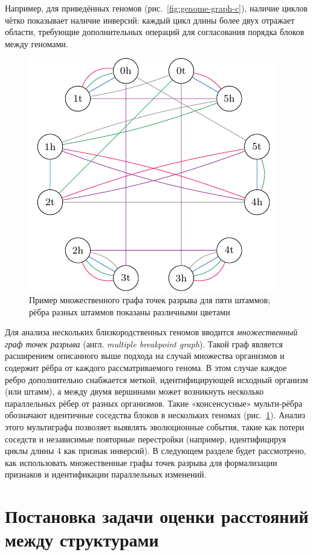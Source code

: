 Например, для приведённых геномов (рис.~\ref{fig:genome-graph-c}), наличие циклов чётко показывает наличие инверсий: каждый цикл длины более двух отражает области, требующие дополнительных операций для согласования порядка блоков между геномами.

\begin{figure}[h!]
    \centering
    \includegraphics[width=0.5\linewidth]{images/part1/genome-graph-pq7.pdf}
    \caption{Пример множественного графа точек разрыва для пяти штаммов; рёбра разных штаммов показаны различными цветами}
    \label{fig:multigraph-example}
\end{figure}

Для анализа нескольких близкородственных геномов вводится \textit{множественный граф точек разрыва} (англ. \textit{multiple breakpoint graph}).
Такой граф является расширением описанного выше подхода на случай множества организмов и содержит рёбра от каждого рассматриваемого генома.
В этом случае каждое ребро дополнительно снабжается меткой, идентифицирующей исходный организм (или штамм), а между двумя вершинами может возникнуть несколько параллельных рёбер от разных организмов.
Такие «консенсусные» мульти-рёбра обозначают идентичные соседства блоков в нескольких геномах (рис.~\ref{fig:multigraph-example}).
Анализ этого мультиграфа позволяет выявлять эволюционные события, такие как потери соседств и независимые повторные перестройки (например, идентифицируя циклы длины 4 как признак инверсий).
В следующем разделе будет рассмотрено, как использовать множественные графы точек разрыва для формализации признаков и идентификации параллельных изменений.

\section{Постановка задачи оценки расстояний между структурами}
\label{sec:distance_estimation}

